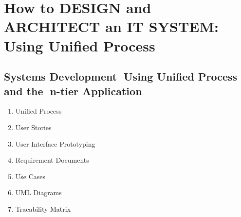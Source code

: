 \section{How to DESIGN and ARCHITECT an IT SYSTEM: Using Unified Process}

\subsection{Systems Development Using Unified Process and the n-tier Application}

\begin{enumerate}
    \item Unified Process
    \item User Stories
    \item User Interface Prototyping
    \item Requirement Documents
    \item Use Cases
    \item UML Diagrams
    \item Tracability Matrix
\end{enumerate}


